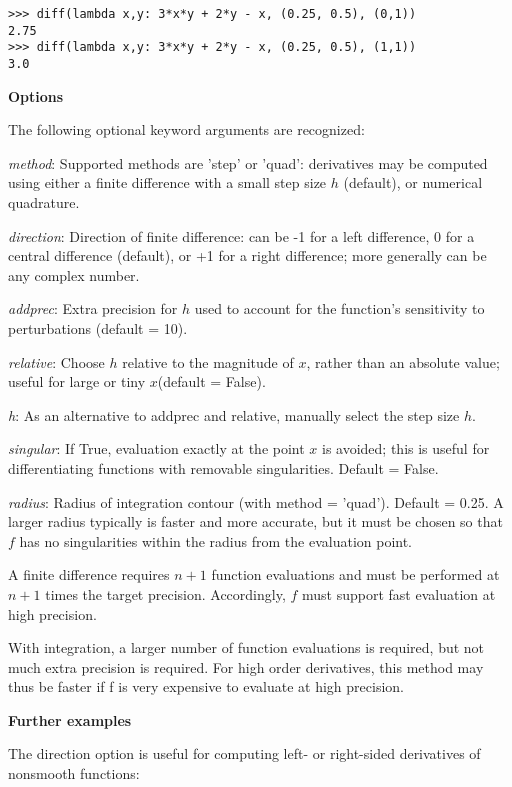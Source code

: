 \begin{lstlisting}
>>> diff(lambda x,y: 3*x*y + 2*y - x, (0.25, 0.5), (0,1))
2.75
>>> diff(lambda x,y: 3*x*y + 2*y - x, (0.25, 0.5), (1,1))
3.0
\end{lstlisting}

\vpara
\textbf{Options}

The following optional keyword arguments are recognized:

\vpara
\textit{method}: Supported methods are 'step' or 'quad': derivatives may be computed using either a finite difference with a small step size $h$ (default), or numerical quadrature.

\vpara
\textit{direction}: Direction of finite difference: can be -1 for a left difference, 0 for a central difference (default), or +1 for a right difference; more generally can be any complex number.

\vpara
\textit{addprec}: Extra precision for $h$ used to account for the function’s sensitivity to perturbations (default = 10).

\vpara
\textit{relative}: Choose $h$ relative to the magnitude of $x$, rather than an absolute value; useful for large or tiny $x$(default = False).

\vpara
\textit{h}: As an alternative to addprec and relative, manually select the step size $h$.

\vpara
\textit{singular}: If True, evaluation exactly at the point $x$ is avoided; this is useful for differentiating functions with removable singularities. Default = False.

\vpara
\textit{radius}: Radius of integration contour (with method = 'quad'). Default = 0.25. A larger radius typically is faster and more accurate, but it must be chosen so that $f$ has no singularities within the radius from the evaluation point.

\vpara
A finite difference requires $n+1$ function evaluations and must be performed at $n+1$ times the target precision. Accordingly, $f$ must support fast evaluation at high precision.

With integration, a larger number of function evaluations is required, but not much extra precision is required. For high order derivatives, this method may thus be faster if f is very expensive to evaluate at high precision.

\vpara
\textbf{Further examples}

The direction option is useful for computing left- or right-sided derivatives of nonsmooth functions:

